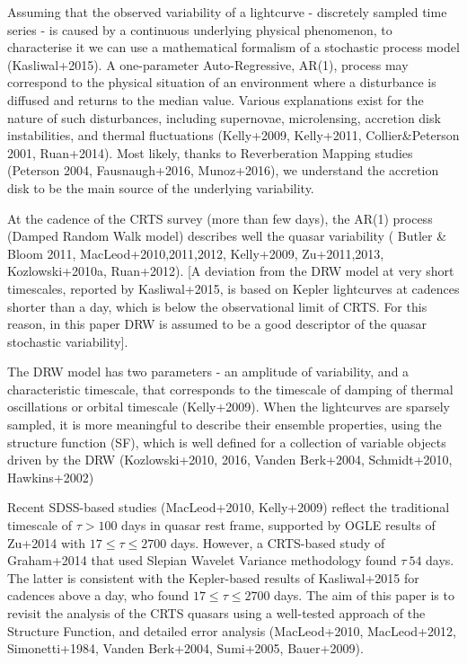 \documentclass[fleqn,usenatbib]{mnras}  %
\begin{document}
Assuming that the observed  variability of a lightcurve -   discretely sampled time series -  is caused by a continuous underlying physical phenomenon, to characterise it we can use a mathematical formalism of a stochastic process model (Kasliwal+2015). A one-parameter Auto-Regressive, AR(1), process  may correspond to the physical situation of an environment where a disturbance is diffused and returns to the median value. Various explanations exist for the nature of such disturbances,  including supernovae, microlensing, accretion disk instabilities, and thermal fluctuations  (Kelly+2009, Kelly+2011, Collier\&Peterson 2001, Ruan+2014).  Most likely, thanks to  Reverberation Mapping studies (Peterson 2004, Fausnaugh+2016,  Munoz+2016), we understand the accretion disk to be  the main source of the underlying variability. 

At the cadence of the CRTS survey (more than few days), the AR(1) process (Damped Random Walk model) describes well the quasar variability ( Butler & Bloom 2011, MacLeod+2010,2011,2012, Kelly+2009, Zu+2011,2013, Kozlowski+2010a, Ruan+2012).  [A deviation from the DRW model at very short timescales, reported by Kasliwal+2015, is based on Kepler lightcurves at cadences shorter than a day, which is below the observational limit of CRTS. For this reason, in this paper DRW is assumed to be a good descriptor of the quasar stochastic variability].
 
The DRW model has two parameters - an amplitude of variability, and a characteristic timescale, that corresponds to the timescale of damping of thermal oscillations or orbital timescale (Kelly+2009).   When the lightcurves are sparsely sampled,  it is more meaningful to describe their ensemble properties,  using the structure function (SF), which is  well defined for a collection of variable objects driven by the DRW (Kozlowski+2010, 2016, Vanden Berk+2004, Schmidt+2010, Hawkins+2002)

 Recent SDSS-based studies (MacLeod+2010, Kelly+2009) reflect the traditional timescale of $\tau > 100 $ days in quasar rest frame, supported by OGLE results of Zu+2014 with $ 17 \leq \tau \leq 2700 $ days. However, a CRTS-based study of Graham+2014 that used Slepian Wavelet Variance methodology found $\tau ~ 54$ days. The latter is consistent with the Kepler-based results of Kasliwal+2015 for cadences above a day, who found   $ 17 \leq \tau \leq 2700 $ days.  The aim of this paper is to revisit the analysis of the CRTS quasars using a  well-tested approach of the Structure Function, and detailed error analysis (MacLeod+2010, MacLeod+2012, Simonetti+1984, Vanden Berk+2004, Sumi+2005, Bauer+2009). 
 
\end{document}
